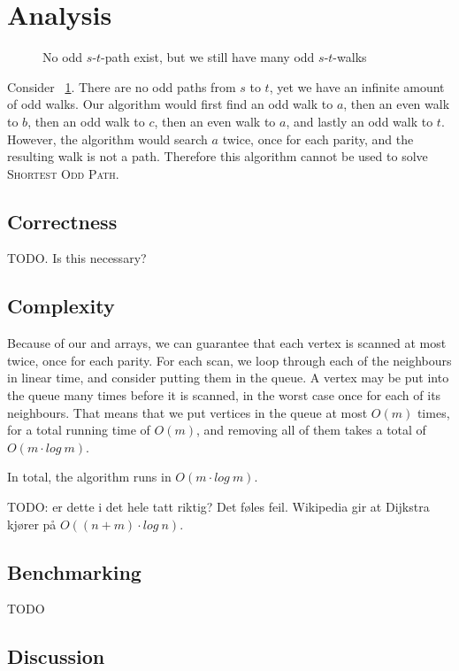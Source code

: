 \section{Analysis}

\begin{figure}
    \centering
    \def\svgwidth{\columnwidth}
    \scalebox{0.7}{}
    \caption{No odd $s$-$t$-path exist, but we still have many odd $s$-$t$-walks}
    \label{small2}
\end{figure}

Consider ~\ref{small2}. There are no odd paths from $s$ to $t$, yet we have an infinite amount of odd walks. Our algorithm would first find an odd walk to $a$, then an even walk to $b$, then an odd walk to $c$, then an even walk to $a$, and lastly an odd walk to $t$. However, the algorithm would search $a$ twice, once for each parity, and the resulting walk is not a path. Therefore this algorithm cannot be used to solve \textsc{Shortest Odd Path}.

\subsection{Correctness}
TODO.
Is this necessary?

\subsection{Complexity}
Because of our  and  arrays, we can guarantee that each vertex is scanned at most twice, once for each parity. 
For each scan, we loop through each of the neighbours in linear time, and consider putting them in the queue. A vertex may be put into the queue many times before it is scanned, in the worst case once for each of its neighbours. That means that we put vertices in the queue at most $O(m)$ times, for a total running time of $O(m)$, and removing all of them takes a total of $O(m \cdot log ~ m)$. 

In total, the algorithm runs in $O(m \cdot log ~ m)$.

TODO: er dette i det hele tatt riktig? Det føles feil. Wikipedia gir at Dijkstra kjører på $O((n+m) \cdot log ~ n)$.

\subsection{Benchmarking}
TODO

\subsection{Discussion}
